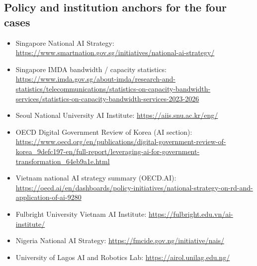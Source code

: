 \documentclass[11pt]{article}
\begin{document}
\subsection{Policy and institution anchors for the four cases}
\begin{itemize}[leftmargin=1.4em,itemsep=0.15em]
    \item Singapore National AI Strategy: \url{https://www.smartnation.gov.sg/initiatives/national-ai-strategy/}
    \item Singapore IMDA bandwidth / capacity statistics: \url{https://www.imda.gov.sg/about-imda/research-and-statistics/telecommunications/statistics-on-capacity-bandwidth-services/statistics-on-capacity-bandwidth-services-2023-2026}
    \item Seoul National University AI Institute: \url{https://aiis.snu.ac.kr/eng/}
    \item OECD Digital Government Review of Korea (AI section): \url{https://www.oecd.org/en/publications/digital-government-review-of-korea_9defc197-en/full-report/leveraging-ai-for-government-transformation_64eb9a1e.html}
    \item Vietnam national AI strategy summary (OECD.AI): \url{https://oecd.ai/en/dashboards/policy-initiatives/national-strategy-on-rd-and-application-of-ai-9280}
    \item Fulbright University Vietnam AI Institute: \url{https://fulbright.edu.vn/ai-institute/}
    \item Nigeria National AI Strategy: \url{https://fmcide.gov.ng/initiative/nais/}
    \item University of Lagos AI and Robotics Lab: \url{https://airol.unilag.edu.ng/}
\end{itemize}
\end{document}
